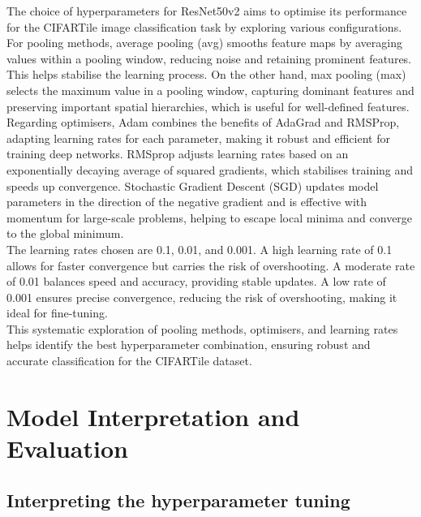 \documentclass{article}
\begin{document}
The choice of hyperparameters for ResNet50v2 aims to optimise its 
performance for the CIFARTile image classification task by exploring 
various configurations.\\

For pooling methods, average pooling (avg) smooths feature maps
by averaging values within a pooling window, reducing noise and 
retaining prominent features. This helps stabilise the learning 
process. On the other hand, max pooling (max) selects the maximum 
value in a pooling window, capturing dominant features and preserving 
important spatial hierarchies, which is useful for well-defined features.\\

Regarding optimisers, Adam combines the benefits of AdaGrad and RMSProp, 
adapting learning rates for each parameter, making it robust and efficient
for training deep networks. RMSprop adjusts learning rates based on an
exponentially decaying average of squared gradients, which stabilises
training and speeds up convergence. Stochastic Gradient Descent (SGD)
updates model parameters in the direction of the negative gradient and
is effective with momentum for large-scale problems, helping to escape
local minima and converge to the global minimum.\\

The learning rates chosen are 0.1, 0.01, and 0.001. 
A high learning rate of 0.1 allows for faster convergence 
but carries the risk of overshooting. A moderate rate of 0.01
balances speed and accuracy, providing stable updates. A low rate
of 0.001 ensures precise convergence, reducing the risk of overshooting,
making it ideal for fine-tuning.\\

This systematic exploration of pooling methods, optimisers, and 
learning rates helps identify the best hyperparameter combination, 
ensuring robust and accurate classification for the CIFARTile dataset.

\section{Model Interpretation and Evaluation} \label{evaluation}

\subsection{Interpreting the hyperparameter tuning}
\end{document}
